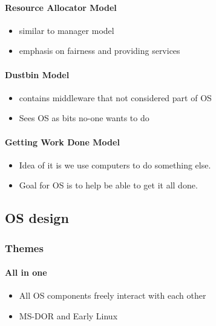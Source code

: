 \documentclass{article}
\newcommand\tab[1][0.5cm]{\hspace*{#1}}
\begin{document}
		\paragraph{\tab Resource Allocator Model}
			\begin{itemize}
				\item similar to manager model
				\item emphasis on fairness and providing services
			\end{itemize}

		\paragraph{\tab Dustbin Model}
			\begin{itemize}
				\item contains middleware that not considered part of OS
				\item Sees OS as bits no-one wants to do
			\end{itemize}

		\paragraph{\tab Getting Work Done Model}
			\begin{itemize}
				\item Idea of it is we use computers to do something else.
				\item Goal for OS is to help be able to get it all done.
			\end{itemize}


	\subsection{OS design}
		\subsubsection{Themes}
			\paragraph{\tab All in one}
			\begin{itemize}
				\item All OS components freely interact with each other
				\item MS-DOR and Early Linux
			\end{itemize}
\end{document}
